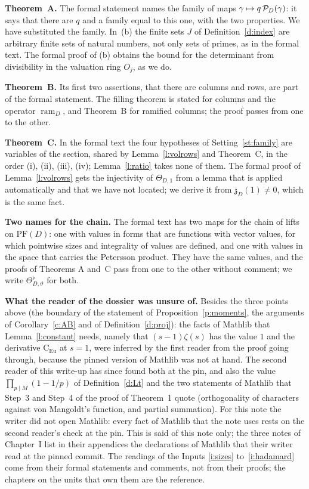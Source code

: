 \documentclass[11pt,a4paper]{article}
\newcommand{\subhead}[1]{\par\addvspace{9pt plus 2pt}\Needspace{4\baselineskip}\noindent\textbf{#1}\enspace\ignorespaces}
\theoremstyle{plainx}
\theoremstyle{uprightx}
\newcommand{\Eu}{\mathrm{C}_{\mathrm{Eu}}}
\newcommand{\PF}[1]{\mathrm{PF}(#1)}
\newcommand{\Th}[2]{\Theta_{#1,#2}}
\newcommand{\Thf}[2]{\Theta^{\flat}_{#1,#2}}
\newcommand{\zz}[2]{\mathfrak{z}_{#1}(#2)}
\begin{document}
\subhead{Theorem~A.} The formal statement names the family of maps $\gamma\mapsto q\,\mathcal{P}_{D}(\gamma)$:
it says that there are $q$ and a family equal to this one, with the two properties. We have substituted the
family. In~(b) the finite sets $J$ of Definition~\ref{d:index} are arbitrary finite sets of natural numbers, not
only sets of primes, as in the formal text. The formal proof of (b) obtains the bound for the determinant from
divisibility in the valuation ring $O_j$, as we do.

\subhead{Theorem~B.} Its first two assertions, that there are columns and rows, are part of the formal statement.
The filling theorem is stated for columns and the operator $\operatorname{ram}_D$, and Theorem~B for ramified
columns; the proof passes from one to the other.

\subhead{Theorem~C.} In the formal text the four hypotheses of Setting~\ref{st:family} are variables of the section,
shared by Lemma~\ref{l:volrows} and Theorem~C, in the order (i), (ii), (iii), (iv); Lemma~\ref{l:ratio} takes none of
them. The formal proof of Lemma~\ref{l:volrows} gets the injectivity of $\Th{D}{1}$ from a lemma that is applied
automatically and that we have not located; we derive it from $\zz{D}{1}\ne0$, which is the same fact.

\subhead{Two names for the chain.} The formal text has two maps for the chain of lifts on $\PF{D}$: one with values
in forms that are functions with vector values, for which pointwise sizes and integrality of values are defined,
and one with values in the space that carries the Petersson product. They have the same values, and the proofs of
Theorems A and~C pass from one to the other without comment; we write $\Thf{D}{\vartheta}$ for both.

\subhead{What the reader of the dossier was unsure of.} Besides the three points above (the boundary of the
statement of Proposition~\ref{p:moments}, the arguments of Corollary~\ref{c:AB} and of Definition~\ref{d:proj}): the
facts of Mathlib that Lemma~\ref{l:constant} needs, namely that $(s-1)\zeta(s)$ has the value $1$ and the derivative
$\Eu$ at $s=1$, were inferred by the first reader from the proof going through, because the pinned version of
Mathlib was not at hand. The second reader of this write-up has since found both at the pin, and also the value
$\prod_{p\mid M}(1-1/p)$ of Definition~\ref{d:Lt} and the two statements of Mathlib that Step~3 and Step~4 of the
proof of Theorem~1 quote (orthogonality of characters against von Mangoldt's function, and partial summation). For
this note the writer did not open Mathlib: every fact of Mathlib that the note uses rests on the second reader's
check at the pin. This is said of this note only; the three notes of Chapter~I list in their appendices the
declarations of Mathlib that their writer read at the pinned commit. The readings of the Inputs \ref{i:sizes} to~\ref{i:hadamard} come from their formal statements and
comments, not from their proofs; the chapters on the units that own them are the reference.
\end{document}
